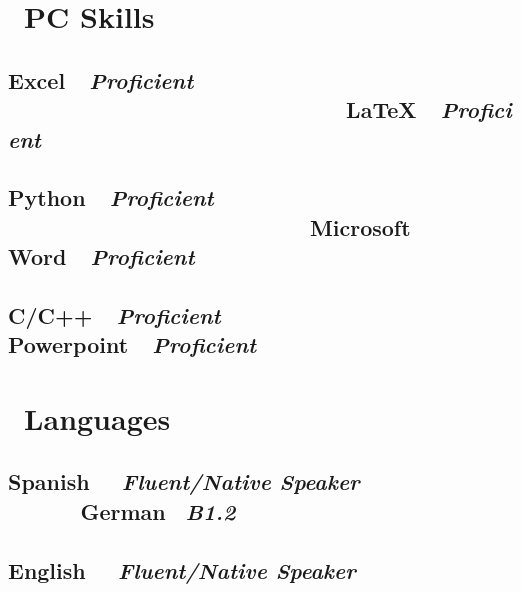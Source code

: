 \documentclass[12pt]{article}
\begin{document}
\section{\faCode \ PC Skills}
	\subsection{\textbf{Excel}\ \ \textit{Proficient} \ \ \ \ \ \ \ \ \ \ \ \ \ \ \ \ \ \ \ \ \ \ \ \ \ \ \ \faAngleDoubleRight \ \textbf{\LaTeX}\ \ \textit{Proficient}}
	\subsection{\textbf{Python}\ \ \textit{Proficient} \ \ \ \ \ \ \ \ \ \ \ \ \ \ \ \ \ \ \ \ \ \ \ \ \faAngleDoubleRight \ \textbf{Microsoft Word}\ \ \textit{Proficient}}
	\subsection{\textbf{C/C++}\ \ \textit{Proficient}\ \ \ \ \ \ \ \ \ \ \ \ \ \ \ \ \ \ \ \ \ \ \ \faAngleDoubleRight \ \textbf{Powerpoint}\ \ \textit{Proficient}}
\section{\faLanguage \ Languages}
	\subsection{\textbf{Spanish} \ \ \textit{Fluent/Native Speaker} \ \ \ \ \ \faAngleDoubleRight \ \textbf{German} \ \textit{B1.2}}
	\subsection{\textbf{English} \ \ \textit{Fluent/Native Speaker}}


\end{document}
